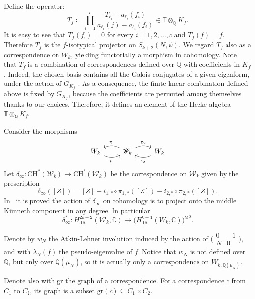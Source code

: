 \documentclass[11pt, a4paper, reqno]{amsart}
\theoremstyle{definition}
\theoremstyle{plain}
\theoremstyle{remark}
\DeclareMathOperator{\dR}{dR}
\newcommand{\numberset}{\mathbb}
\newcommand{\C}{\numberset{C}}
\newcommand{\Q}{\numberset{Q}}
\newcommand{\CH}{\mathrm{CH}}
\newcommand{\KS}{\mathscr{W}}
\begin{document}
\begin{list}{}
        Define the operator:
        \[
            T_f \coloneqq \prod_{i=1}^c \frac{T_{\ell_i} - a_{\ell_i}(f_i)}{a_{\ell_i}(f) - a_{\ell_i}(f_i)} \in \mathbb{T}\otimes_{\Q} K_f.
        \]
        It is easy to see that $T_f(f_i) = 0$ for every $i=1,2,\ldots,c$ and $T_f(f) = f$. Therefore $T_f$ is the $f$-isotypical projector on $S_{k+2}(N,\psi)$. We regard $T_f$ also as a correspondence on $W_k$, yielding functorially a morphism in cohomology. Note that $T_f$ is a combination of correspondences defined over $\Q$ with coefficients in $K_f$. Indeed, the chosen basis contains all the Galois conjugates of a given eigenform, under the action of $G_{K_f}$ . As a consequence, the finite linear combination defined above is fixed by $G_{K_f}$, because the coefficients are permuted among themselves thanks to our choices. Therefore, it defines an element of the Hecke algebra $\mathbb{T}\otimes_{\Q} K_f$.
    \item[Projection onto the middle Künneth component] Consider the morphisms
        \[
            \begin{tikzcd}
                W_k \arrow[bend right=25,"i_1",swap]{r} & \KS_k \arrow[bend left=25,"\pi_2"]{r} \arrow[bend right=25,"\pi_1",swap]{l} & W_k \arrow[bend left=25,"i_2"]{l}
            \end{tikzcd}
        \]
        Let $\delta_{\infty} \colon \CH^*(\KS_k) \to \CH^*(\KS_k)$ be the correspondence on $\KS_k$ given by the prescription
        \[
            \delta_{\infty}([Z]) = [Z] - i_{1,*}\circ\pi_{1,*}([Z]) - i_{2,*}\circ\pi_{2,*}([Z]).
        \]
        In~\cite[§2]{darmonrotger12} it is proved the action of $\delta_{\infty}$ on cohomology is to project onto the middle Künneth component in any degree. In particular
        \[
            \delta_{\infty}^* \colon H^{2k+2}_{\dR}(\KS_k,\C) \to \bigl(H^{k+1}_{\dR}(W_k,\C)\bigr)^{\otimes 2}.
        \]
    \item[Atkin-Lehner involution] Denote by $w_N$ the Atkin-Lehner involution induced by the action of $\bigl(\begin{smallmatrix} 0 & -1 \\ N & 0 \end{smallmatrix}\bigr)$, and with $\lambda_N(f)$ the pseudo-eigenvalue of $f$. Notice that $w_N$ is not defined over $\Q$, but only over $\Q(\mu_N)$, so it is actually only a correspondence on $W_{k,\Q(\mu_N)}$.
\end{list}
Denote also with $\mathrm{gr}$ the graph of a correspondence. For a correspondence $c$ from $C_1$ to $C_2$, its graph is a subset $\mathrm{gr}(c) \subseteq C_1 \times C_2$.
\end{document}
